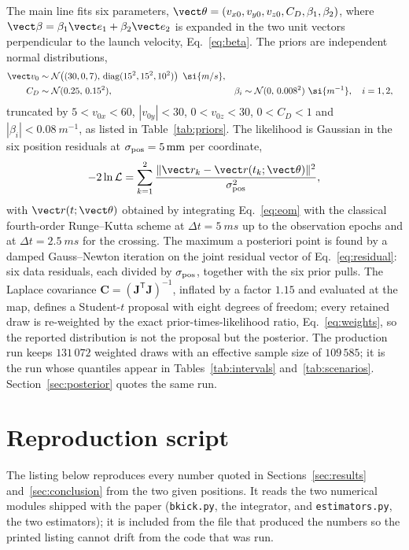 The main line fits six parameters,
$\vect\theta=(v_{x0},v_{y0},v_{z0},C_D,\beta_1,\beta_2)$, where
$\vect\beta=\beta_1\vect e_1+\beta_2\vect e_2$ is expanded in the two unit
vectors perpendicular to the launch velocity, Eq.~\eqref{eq:beta}. The priors
are independent normal distributions,
\begin{align}
  \vect v_0 &\sim \mathcal N\!\left((30,0,7),\,
     \operatorname{diag}(15^{2},15^{2},10^{2})\right)\ \si{m/s}, \\
  C_D &\sim \mathcal N(0.25,\,0.15^{2}), &
  \beta_i &\sim \mathcal N(0,\,0.008^{2})\ \si{m^{-1}},
     \quad i=1,2 ,
\end{align}
truncated by $5<v_{0x}<60$, $|v_{0y}|<30$, $0<v_{0z}<30$, $0<C_D<1$ and
$|\beta_i|<0.08\ \si{m^{-1}}$, as listed in Table~\ref{tab:priors}. The
likelihood is Gaussian in the six position residuals at
$\sigma_{\rm pos}=\SI{5}{mm}$ per coordinate,
\begin{equation}
  -2\ln\mathcal L = \sum_{k=1}^{2}
  \frac{\lVert \vect r_k-\vect r(t_k;\vect\theta)\rVert^{2}}{\sigma_{\rm pos}^{2}},
\end{equation}
with $\vect r(t;\vect\theta)$ obtained by integrating
Eq.~\eqref{eq:eom} with the classical fourth-order Runge--Kutta scheme at
$\Delta t=\SI{5}{ms}$ up to the observation epochs and at
$\Delta t=\SI{2.5}{ms}$ for the crossing. The maximum a posteriori point is
found by a damped Gauss--Newton iteration on the joint residual vector of
Eq.~\eqref{eq:residual}: six data residuals, each divided by $\sigma_{\rm pos}$,
together with the six prior pulls. The Laplace covariance
$\mathbf{C}=(\mathbf J^{\mathsf T}\mathbf J)^{-1}$, inflated by a factor
$1.15$ and evaluated at the map, defines a Student-$t$ proposal with eight
degrees of freedom; every retained draw is re-weighted by the exact
prior-times-likelihood ratio, Eq.~\eqref{eq:weights}, so the reported
distribution is not the proposal but the posterior. The production run keeps
$131\,072$ weighted draws with an effective sample size of $109\,585$; it is
the run whose quantiles appear in Tables~\ref{tab:intervals}
and~\ref{tab:scenarios}. Section~\ref{sec:posterior} quotes the same run.

\section{Reproduction script}
\label{app:code}

The listing below reproduces every number quoted in
Sections~\ref{sec:results} and~\ref{sec:conclusion} from the two given
positions. It reads the two numerical modules shipped with the paper
(\texttt{bkick.py}, the integrator, and \texttt{estimators.py}, the two
estimators); it is included from the file that produced the numbers so the
printed listing cannot drift from the code that was run.

